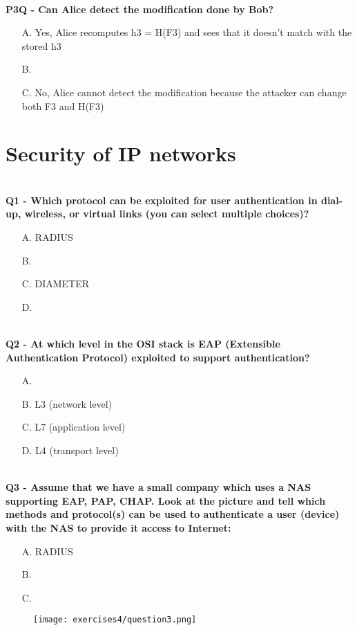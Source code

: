 \textbf{\\P3Q - Can Alice detect the modification done by Bob?}
\begin{itemize}
    \item[A.] Yes, Alice recomputes h3 = H(F3) and sees that it doesn't match with the stored h3
    \item[B.] 
    \item[C.] No, Alice cannot detect the modification because the attacker can change both F3 and H(F3)
\end{itemize}

\section{Security of IP networks}
\textbf{\\Q1 - Which protocol can be exploited for user authentication in dial-up, wireless, or virtual links (you can select multiple choices)?}
\begin{itemize}
    \item[A.] RADIUS
    \item[B.] 
    \item[C.] DIAMETER
    \item[D.] 
\end{itemize}

\textbf{\\Q2 - At which level in the OSI stack is EAP (Extensible Authentication Protocol) exploited to support authentication?}
\begin{itemize}
    \item[A.] 
    \item[B.] L3 (network level)
    \item[C.] L7 (application level)
    \item[D.] L4 (transport level)
\end{itemize}

\textbf{\\Q3 - Assume that we have a small company which uses a NAS supporting EAP, PAP, CHAP. Look at the picture and tell which methods and protocol(s) can be used to authenticate a user (device) with the NAS to provide it access to Internet:}
\begin{itemize}
    \item[A.] RADIUS
    \item[B.] 
    \item[C.] 
\end{itemize}
\begin{figure}[h]
    \centering
    \texttt{[image: exercises4/question3.png]}
\end{figure}

